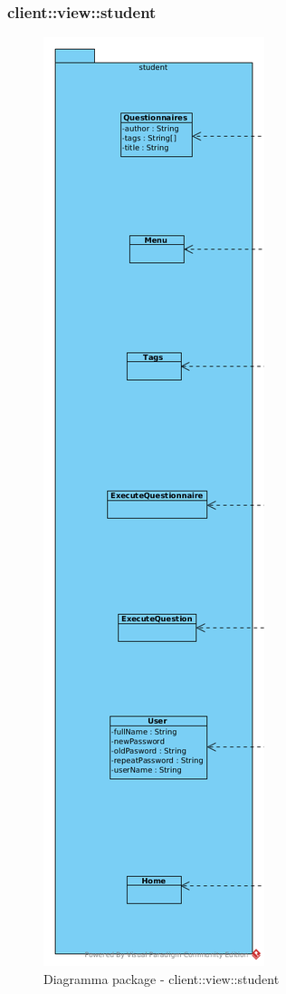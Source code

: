 \subsubsection{client::view::student}
\begin{center}
		\begin{figure}[H]
			\centering \includegraphics[scale=4, max width=\textwidth, max height=\myheight]{../img/diagrammiClassi/client/view/student.png}
			\caption{Diagramma package - client::view::student}
		\end{figure}
	\end{center}\hypertarget{client::view::student::Menu}{}
